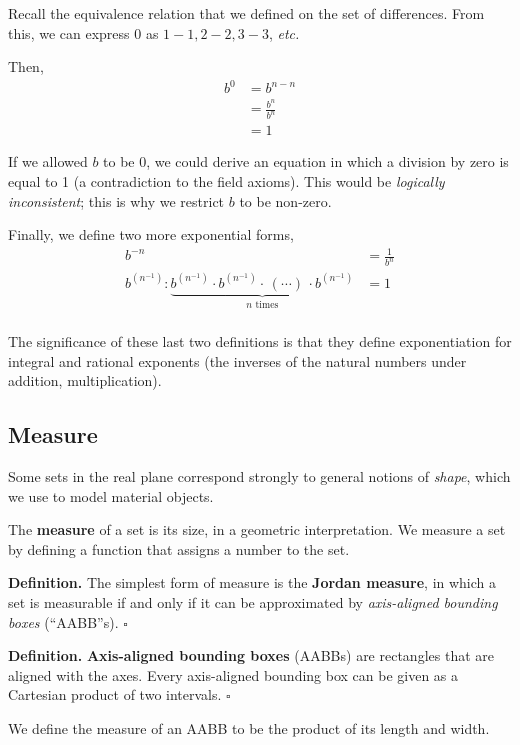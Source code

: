 \documentclass[letterpaper,twoside]{article}
\def\SmallHSpace{\hspace*{1mm}}
\newcommand{\DefinedTerm}[1]{\textbf{#1}}
\newcommand{\Definition}[1]{%
    \emoji{book} \textbf{Definition.}\SmallHSpace #1 \hfill $\square$
}
\begin{document}
\begin{multicols*}{2}
Recall the equivalence relation that we defined on the set of differences.
From this, we can express 0 as $1-1, 2-2, 3-3$, \textit{etc.}

Then,
\begin{align*}
    b^{0}&=b^{n-n}\\
    &=\frac{b^n}{b^n}\\
    &=1
\end{align*}

If we allowed $b$ to be 0, we could derive an equation in which a division by zero is equal to 1 (a contradiction to the field axioms).
This would be \textit{logically inconsistent}; this is why we restrict $b$ to be non-zero.

Finally, we define two more exponential forms,
\begin{align*}
    b^{-n}&=\frac{1}{b^n}\\
    b^{\left(n^{-1}\right)} : \underbrace{b^{\left(n^{-1}\right)}\cdot b^{\left(n^{-1}\right)} \cdot\, (\cdots)\, \cdot b^{\left(n^{-1}\right)}}_{n \text{ times}} &= 1\\
\end{align*}

The significance of these last two definitions is that they define exponentiation for integral and rational exponents (the inverses of the natural numbers under addition, multiplication).

\subsection{Measure}

Some sets in the real plane correspond strongly to general notions of \textit{shape}, which we use to model material objects.

The \textbf{measure} of a set is its size, in a geometric interpretation.
We measure a set by defining a function that assigns a number to the set.

\Definition
{
    The simplest form of measure is the \DefinedTerm{Jordan measure}, in which a set is measurable if and only if it can be approximated by \textit{axis-aligned bounding boxes} (``AABB''s).
}

\Definition
{
    \DefinedTerm{Axis-aligned bounding boxes} (AABBs) are rectangles that are aligned with the axes.
    Every axis-aligned bounding box can be given as a Cartesian product of two intervals.
}

We define the measure of an AABB to be the product of its length and width.


\end{multicols*}
\end{document}
